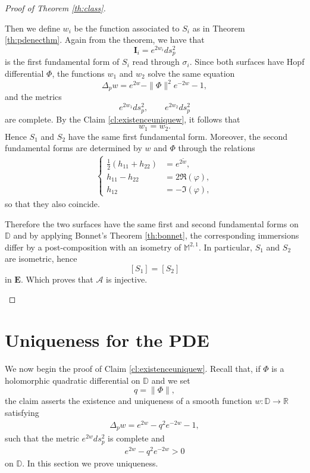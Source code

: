 \documentclass[a4paper,11pt,openright,twoside]{book}
\newcommand{\M}{\mathbb{M}^{2,1}}
\newcommand{\I}{\mathbf{I}}
\newcommand{\1}{\mathds{1}}
\theoremstyle{plain}
\theoremstyle{definition}
\theoremstyle{remark}
\begin{document}
\begin{proof}[Proof of Theorem \ref{th:class}]
\begin{enumerate}[noitemsep,leftmargin=*,label=\textbf{\arabic*.}]
Then we define $w_i$ be the function associated to $S_i$ as in Theorem \ref{th:pdenecthm}. Again from the theorem, we have that
\[
\I_i=e^{2w_i}ds_p^2
\]
is the first fundamental form of $S_i$ read through $\sigma_i$. Since both surfaces have Hopf differential $\Phi$, the functions $w_1$ and $w_2$ solve the same equation
\[
\Delta_p w = e^{2w}-\|\Phi\|^2e^{-2w}-1,
\]
and the metrics
\[
e^{2w_1}ds_p^2,
\qquad
e^{2w_2}ds_p^2
\]
are complete. By the Claim \ref{cl:existenceuniquew}, it follows that
\[
w_1=w_2.
\]
Hence $S_1$ and $S_2$ have the same first fundamental form. Moreover, the second fundamental forms are determined by $w$ and $\Phi$ through the relations 
\begin{align*}
	\begin{cases}
	\frac{1}{2}(h_{11}+h_{22})&=e^{2\tilde w},\\
	h_{11}-h_{22}&=2\Re(\varphi),\\
	h_{12}&=-\Im(\varphi),
	\end{cases}
\end{align*}
so that they also coincide.

Therefore the two surfaces have the same first and second fundamental forms on $\mathbb{D}$ and by applying Bonnet's Theorem \ref{th:bonnet}, the corresponding immersions differ by a post-composition with an isometry of $\M$. In particular, $S_1$ and $S_2$ are isometric, hence
\[
[S_1]=[S_2]
\]
in $\mathbf{E}$.
Which proves that $\mathscr A$ is injective.
\end{enumerate}
\end{proof}



\chapter{Uniqueness for the PDE}
We now begin the proof of Claim \ref{cl:existenceuniquew}. Recall that, if $\Phi$ is a holomorphic quadratic differential on $\mathbb{D}$ and we set
\[
q=\|\Phi\|,
\]
the claim asserts the existence and uniqueness of a smooth function $w:\mathbb{D}\to\mathbb{R}$ satisfying
\begin{align}\label{eq:box}
	\Delta_p w = e^{2w}-q^2e^{-2w}-1,
\end{align}
such that the metric $e^{2w}ds_p^2$ is complete and
\begin{align}\label{eq:box2}
	e^{2w}-q^2e^{-2w}>0
\end{align}
on $\mathbb{D}$.
In this section we prove uniqueness.
\end{document}
